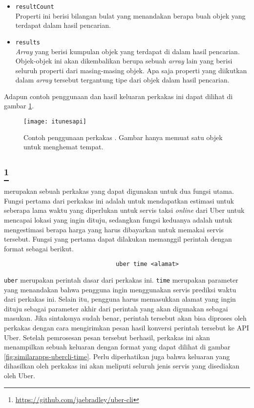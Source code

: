 \begin{itemize}
	\item \verb|resultCount|\\
	Properti ini berisi bilangan bulat yang menandakan berapa buah objek yang terdapat dalam hasil pencarian.
	\item \verb|results|\\
	\textit{Array} yang berisi kumpulan objek yang terdapat di dalam hasil pencarian. Objek-objek ini akan dikembalikan berupa sebuah \textit{array} lain yang berisi seluruh properti dari masing-masing objek. Apa saja properti yang diikutkan dalam \textit{array} tersebut tergantung tipe dari objek dalam hasil pencarian.
\end{itemize}
\vspace{\baselineskip}
Adapun contoh penggunaan dan hasil keluaran perkakas ini dapat dilihat di gambar \ref{fig:similarapps-itunesapi}.

\begin{figure}[ht]
    \centering
    \texttt{[image: itunesapi]}
    \caption[Contoh penggunaan perkakas \itunesapi]{Contoh penggunaan perkakas \itunesapi. Gambar hanya memuat satu objek untuk menghemat tempat.}
    \label{fig:similarapps-itunesapi}
\end{figure}

\subsection{\ubercli\footnote{\href{https://github.com/jaebradley/uber-cli}{https://github.com/jaebradley/uber-cli}}}
\label{sec:similarapps-ubercli}

\ubercli merupakan sebuah perkakas \cl yang dapat digunakan untuk dua fungsi utama. Fungsi pertama dari perkakas ini adalah untuk mendapatkan estimasi untuk seberapa lama waktu yang diperlukan untuk servis taksi \textit{online} dari Uber untuk mencapai lokasi yang ingin dituju, sedangkan fungsi keduanya adalah untuk mengestimasi berapa harga yang harus dibayarkan untuk memakai servis tersebut. 
\newline\newline\noindent
Fungsi yang pertama dapat dilakukan memanggil perintah dengan format sebagai berikut.

\begin{verbatim}
                                uber time <alamat>
\end{verbatim}

\verb|uber| merupakan perintah dasar dari perkakas ini. \verb|time| merupakan parameter yang menandakan bahwa pengguna ingin menggunakan servis prediksi waktu dari perkakas ini. Selain itu, pengguna harus memasukkan alamat yang ingin dituju sebagai parameter akhir dari perintah yang akan digunakan sebagai masukan. Jika sintaksnya sudah benar, perintah tersebut akan bisa diproses oleh perkakas dengan cara mengirimkan pesan hasil konversi perintah tersebut ke API Uber. Setelah pemrosesan pesan tersebut berhasil, perkakas ini akan menampilkan sebuah keluaran dengan format yang dapat dilihat di gambar \ref{fig:similarapps-ubercli-time}. Perlu diperhatikan juga bahwa keluaran yang dihasilkan oleh perkakas ini akan meliputi seluruh jenis servis yang disediakan oleh Uber.

